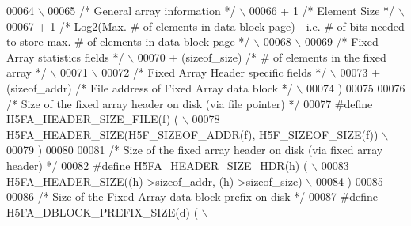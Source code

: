 \begin{DoxyCode}
00064 \textcolor{preprocessor}{                                                                              \(\backslash\)}
00065 \textcolor{preprocessor}{    }\textcolor{comment}{/* General array information */}\textcolor{preprocessor}{                                           \(\backslash\)}
00066 \textcolor{preprocessor}{    + 1 }\textcolor{comment}{/* Element Size */}\textcolor{preprocessor}{                                                    \(\backslash\)}
00067 \textcolor{preprocessor}{    + 1 }\textcolor{comment}{/* Log2(Max. # of elements in data block page) - i.e. # of bits needed to store max. # of elements
       in data block page */}\textcolor{preprocessor}{ \(\backslash\)}
00068 \textcolor{preprocessor}{                                                                              \(\backslash\)}
00069 \textcolor{preprocessor}{    }\textcolor{comment}{/* Fixed Array statistics fields */}\textcolor{preprocessor}{                                       \(\backslash\)}
00070 \textcolor{preprocessor}{    + (sizeof\_size) }\textcolor{comment}{/* # of elements in the fixed array */}\textcolor{preprocessor}{                \(\backslash\)}
00071 \textcolor{preprocessor}{                                                                              \(\backslash\)}
00072 \textcolor{preprocessor}{    }\textcolor{comment}{/* Fixed Array Header specific fields */}\textcolor{preprocessor}{                                  \(\backslash\)}
00073 \textcolor{preprocessor}{    + (sizeof\_addr) }\textcolor{comment}{/* File address of Fixed Array data block */}\textcolor{preprocessor}{          \(\backslash\)}
00074 \textcolor{preprocessor}{    )}
00075 
00076 \textcolor{comment}{/* Size of the fixed array header on disk (via file pointer) */}
00077 \textcolor{preprocessor}{#define H5FA\_HEADER\_SIZE\_FILE(f)   (                                          \(\backslash\)}
00078 \textcolor{preprocessor}{    H5FA\_HEADER\_SIZE(H5F\_SIZEOF\_ADDR(f), H5F\_SIZEOF\_SIZE(f))                  \(\backslash\)}
00079 \textcolor{preprocessor}{    )}
00080 
00081 \textcolor{comment}{/* Size of the fixed array header on disk (via fixed array header) */}
00082 \textcolor{preprocessor}{#define H5FA\_HEADER\_SIZE\_HDR(h)   (                                           \(\backslash\)}
00083 \textcolor{preprocessor}{    H5FA\_HEADER\_SIZE((h)->sizeof\_addr, (h)->sizeof\_size)                      \(\backslash\)}
00084 \textcolor{preprocessor}{    )}
00085 
00086 \textcolor{comment}{/* Size of the Fixed Array data block prefix on disk */}
00087 \textcolor{preprocessor}{#define H5FA\_DBLOCK\_PREFIX\_SIZE(d)  (                                       \(\backslash\)}

\end{DoxyCode}
